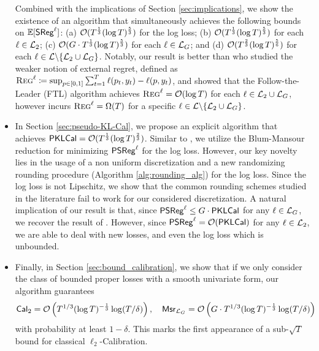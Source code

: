 \begin{itemize}[leftmargin=*]
Combined with the implications of Section \ref{sec:implications}, we show the existence of an algorithm that simultaneously achieves the following bounds on $\mathbb{E}[\mathsf{SReg}^{\ell}]$: (a) $\mathcal{O}(T^{\frac{1}{3}} (\log T) ^ {\frac{5}{3}})$ for the log loss; (b) $\mathcal{O}(T^{\frac{1}{3}} (\log T) ^ {\frac{5}{3}})$  for each $\ell \in \mathcal{L}_{2}$; (c) $\mathcal{O}(G \cdot T^{\frac{1}{3}} (\log T) ^ {\frac{5}{3}})$ for each $\ell \in \mathcal{L}_{G}$; and (d) $\mathcal{O}(T^{\frac{2}{3}} (\log T) ^ {\frac{5}{6}})$ for each $\ell \in \mathcal{L} \backslash \{\mathcal{L}_{2} \cup \mathcal{L}_{G}\}$. Notably, our result is better than \cite{luo2024optimal} who studied the weaker notion of external regret, defined as $\textsc{Reg}^{\ell} \coloneqq \sup_{p \in [0, 1]} \sum_{t = 1} ^ {T} \ell(p_{t}, y_{t}) - \ell(p, y_{t})$,
and showed that the Follow-the-Leader (FTL) algorithm achieves $\textsc{Reg}^{\ell} = \mathcal{O}(\log T)$ for each $\ell \in \mathcal{L}_{2} \cup \mathcal{L}_{G}$, however incurs $\textsc{Reg}^{\ell} = \Omega (T)$ for a specific $\ell \in \mathcal{L} \backslash \{\mathcal{L}_{2} \cup \mathcal{L}_{G}\}$. 

\item In Section \ref{sec:pseudo-KL-Cal}, we propose an explicit algorithm that achieves $\mathsf{PKLCal} = \mathcal{O}(T^{\frac{1}{3}} (\log T) ^ \frac{2}{3})$. Similar to \cite{fishelsonfull}, we utilize the Blum-Mansour reduction for minimizing $\mathsf{PSReg}^{\ell}$ for the log loss. However, our key novelty lies in the usage of a non uniform discretization and a new randomizing rounding procedure (Algorithm \ref{alg:rounding_alg}) for the log loss. Since the log loss is not Lipschitz, we show that the common rounding schemes studied in the literature fail to work for our considered discretization. 
A natural implication of our result is that, since $\mathsf{PSReg}^{\ell} \le G \cdot \mathsf{PKLCal}$ for any $\ell \in \mathcal{L}_{G}$, we recover the result of \cite{fishelsonfull}. However, since $\mathsf{PSReg}^{\ell} = \mathcal{O}(\mathsf{PKLCal})$ for any $\ell \in \mathcal{L}_{2}$, we are able to deal with new losses, and even the log loss which is unbounded.

\item Finally, in Section \ref{sec:bound_calibration}, we show that if we only consider the class of bounded proper losses with a smooth univariate form, our algorithm guarantees $$\mathsf{Cal}_{2} = {\mathcal{O}}\left( T^{1/3} (\log T) ^ {-\frac{1}{3}}\log (T/{\delta}) \right), \quad \mathsf{Msr}_{\mathcal{L}_{G}} = {\mathcal{O}}\left( G \cdot T^{1/3} (\log T) ^ {-\frac{1}{3}}\log (T/{\delta}) \right)$$ with probability at least $1 - \delta$. This marks the first appearance of a sub-$\sqrt{T}$ bound for classical $\ell_{2}$-Calibration.

\end{itemize}


